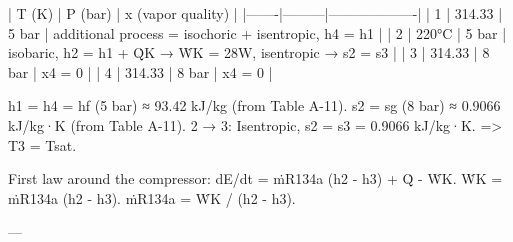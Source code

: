 | T (K) | P (bar) | x (vapor quality) |  
|-------|---------|-------------------|  
| 1     | 314.33  | 5 bar             | additional process = isochoric + isentropic, h4 = h1 |  
| 2     | 220°C   | 5 bar             | isobaric, h2 = h1 + Q̇K → ẆK = 28W, isentropic → s2 = s3 |  
| 3     | 314.33  | 8 bar             | x4 = 0 |  
| 4     | 314.33  | 8 bar             | x4 = 0 |  

h1 = h4 = hf (5 bar) ≈ 93.42 kJ/kg (from Table A-11).  
s2 = sg (8 bar) ≈ 0.9066 kJ/kg·K (from Table A-11).  
2 → 3: Isentropic, s2 = s3 = 0.9066 kJ/kg·K.  
=> T3 = Tsat.  

First law around the compressor:  
dE/dt = ṁR134a (h2 - h3) + Q̇ - ẆK.  
ẆK = ṁR134a (h2 - h3).  
ṁR134a = ẆK / (h2 - h3).  

---